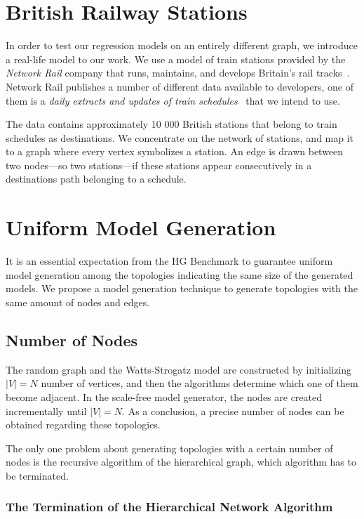 \section{British Railway Stations}

In order to test our regression models on an entirely different graph, we introduce a real-life model to our work. We use a model of train stations provided by the \textit{Network Rail} company that runs, maintains, and develops Britain's rail tracks~\cite{network_rail}. Network Rail publishes a number of different data available to developers, one of them is a \textit{daily extracts and updates of train schedules}~\cite{schedules_data} that we intend to use.

The data contains approximately 10 000 British stations that belong to train schedules as destinations. We concentrate on the network of stations, and map it to a graph where every vertex symbolizes a station. An edge is drawn between two nodes---so two stations---if these stations appear consecutively in a destinations path belonging to a schedule.

\section{Uniform Model Generation}

It is an essential expectation from the HG Benchmark to guarantee uniform model generation among the topologies indicating the same size of the generated models. We propose a model generation technique to generate topologies with the same amount of nodes and edges.

\subsection{Number of Nodes}

The random graph and the Watts-Strogatz model are constructed by initializing $|V| = N$ number of vertices, and then the algorithms determine which one of them become adjacent. In the scale-free model generator, the nodes are created incrementally until $|V| = N$. As a conclusion, a precise number of nodes can be obtained regarding these topologies.

The only one problem about generating topologies with a certain number of nodes is the recursive algorithm of the hierarchical graph, which algorithm has to be terminated.

\subsubsection{The Termination of the Hierarchical Network Algorithm}\label{sec:hierarcical_contribution}

